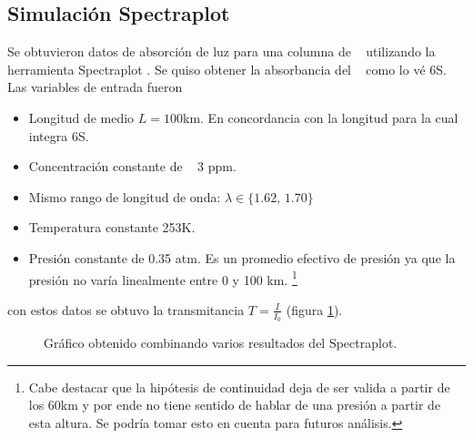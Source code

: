 \documentclass[11pt,titlepage]{article}
\begin{document}
\subsection{Simulaci\'on Spectraplot}
Se obtuvieron datos de absorción de luz para una columna de \metano~ utilizando la herramienta Spectraplot \cite{goldenstein2017spectraplot}. Se quiso obtener la absorbancia del \metano~ como lo vé 6S. Las variables de entrada fueron

\begin{itemize}
    \item Longitud de medio $L=100$km. En concordancia con la longitud para la cual integra 6S.
    \item Concentración constante de \metano~ 3 ppm.
    \item Mismo rango de longitud de onda: $\lambda \in \{1.62,\,1.70\}$
    \item Temperatura constante 253K.
    \item Presión constante de 0.35 atm. Es un promedio efectivo de presión ya que la presión no varía linealmente entre 0 y 100 km. \footnote{Cabe destacar que la hipótesis de continuidad deja de ser valida a partir de los 60km y por ende no tiene sentido de hablar de una presión a partir de esta altura. Se podría tomar esto en cuenta para futuros análisis.}
\end{itemize}

con estos datos se obtuvo la transmitancia $T = \frac{I}{I_0}$ (figura \ref{fig:transmitancia100km3ppm}).

\begin{figure}[htb!]
    \centering
    \caption{Gráfico obtenido combinando varios resultados del Spectraplot.}
    \label{fig:transmitancia100km3ppm}
\end{figure}
\end{document}
